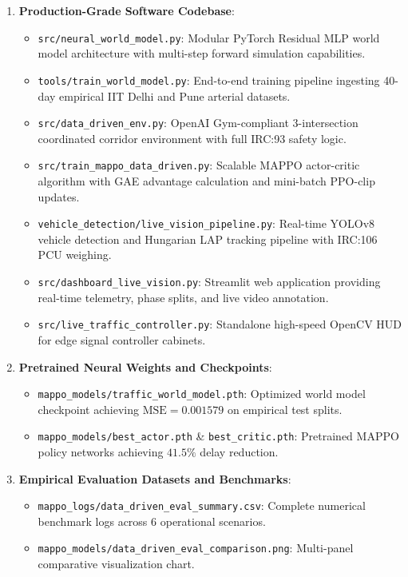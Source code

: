 \documentclass[12pt,a4paper,oneside]{report}
\begin{document}
\begin{enumerate}
    \item \textbf{Production-Grade Software Codebase}:
    \begin{itemize}
        \item \texttt{src/neural\_world\_model.py}: Modular PyTorch Residual MLP world model architecture with multi-step forward simulation capabilities.
        \item \texttt{tools/train\_world\_model.py}: End-to-end training pipeline ingesting 40-day empirical IIT Delhi and Pune arterial datasets.
        \item \texttt{src/data\_driven\_env.py}: OpenAI Gym-compliant 3-intersection coordinated corridor environment with full IRC:93 safety logic.
        \item \texttt{src/train\_mappo\_data\_driven.py}: Scalable MAPPO actor-critic algorithm with GAE advantage calculation and mini-batch PPO-clip updates.
        \item \texttt{vehicle\_detection/live\_vision\_pipeline.py}: Real-time YOLOv8 vehicle detection and Hungarian LAP tracking pipeline with IRC:106 PCU weighing.
        \item \texttt{src/dashboard\_live\_vision.py}: Streamlit web application providing real-time telemetry, phase splits, and live video annotation.
        \item \texttt{src/live\_traffic\_controller.py}: Standalone high-speed OpenCV HUD for edge signal controller cabinets.
    \end{itemize}

    \item \textbf{Pretrained Neural Weights and Checkpoints}:
    \begin{itemize}
        \item \texttt{mappo\_models/traffic\_world\_model.pth}: Optimized world model checkpoint achieving $\text{MSE} = 0.001579$ on empirical test splits.
        \item \texttt{mappo\_models/best\_actor.pth} \& \texttt{best\_critic.pth}: Pretrained MAPPO policy networks achieving $41.5\%$ delay reduction.
    \end{itemize}

    \item \textbf{Empirical Evaluation Datasets and Benchmarks}:
    \begin{itemize}
        \item \texttt{mappo\_logs/data\_driven\_eval\_summary.csv}: Complete numerical benchmark logs across 6 operational scenarios.
        \item \texttt{mappo\_models/data\_driven\_eval\_comparison.png}: Multi-panel comparative visualization chart.
    \end{itemize}
\end{enumerate}
\end{document}
